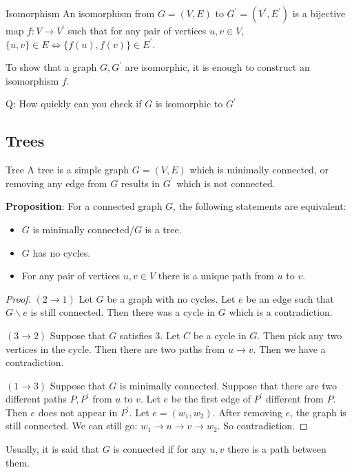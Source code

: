 \documentclass{report}
\begin{document}
\begin{definition}{Isomorphism}
    An isomorphism from $G = (V, E)$ to $G^{\prime} = (V^{\prime}, E^{\prime})$ is a bijective map $f: V \rightarrow V^{\prime}$ such that for any pair of vertices $u, v \in V$, $\{u, v\} \in E \iff \{f(u), f(v)\} \in E^{\prime}$.
\end{definition}

To show that a graph $G,G^{\prime}$ are isomorphic, it is enough to construct an isomorphism $f$.

Q: How quickly can you check if $G$ is isomorphic to $G^{\prime}$

\begin{topic}
    \section{Trees}
\end{topic}

\begin{definition}{Tree}
    A tree is a simple graph $G = (V, E)$ which is minimally connected, or removing any edge from $G$ results in $G^{\prime}$ which is not connected.
\end{definition}

\textbf{Proposition}: For a connected graph $G$, the following statements are equivalent:
    \begin{itemize}
        \item $G$ is minimally connected/$G$ is a tree.

        \item $G$ has no cycles.

        \item For any pair of vertices $u, v \in V$ there is a unique path from $u$ to $v$. 
    \end{itemize}
    \begin{proof}
        $(2 \rightarrow 1)$ Let $G$ be a graph with no cycles. Let $e$ be an edge such that $G\backslash e$ is still connected. Then there was a cycle in $G$ which is a contradiction.

        $(3 \rightarrow 2)$ Suppose that $G$ satisfies $3$. Let $C$ be a cycle in $G$. Then pick any two vertices in the cycle. Then there are two paths from $u \rightarrow v$. Then we have a contradiction.

        $(1 \rightarrow 3)$ Suppose that $G$ is minimally connected. Suppose that there are two different paths $P, P^{\prime}$ from $u$ to $v$. Let $e$ be the first edge of $P^{\prime}$ different from $P$. Then $e$ does not appear in $P^{\prime}$. Let $e = (w_{1}, w_{2})$. After removing $e$, the graph is still connected. We can still go: $w_{1} \rightarrow u \rightarrow v \rightarrow w_{2}$. So contradiction.
    \end{proof}
Usually, it is said that $G$ is connected if for any $u, v$ there is a path between them.
\end{document}
